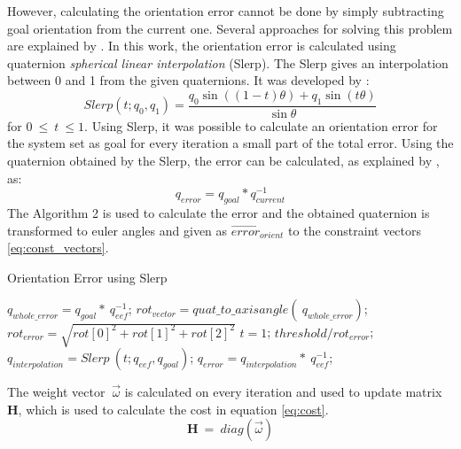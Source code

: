 However, calculating the orientation error cannot be done by simply subtracting goal orientation from the current one. Several approaches for solving this problem are explained by \cite{siciliano}. In this work, the orientation error is calculated using quaternion \textit{spherical linear interpolation} (Slerp). The Slerp gives an interpolation between 0 and 1 from the given quaternions. It was developed by \cite{slerp}:
$$ Slerp(t;q_0,q_1)=\dfrac{q_0\sin((1-t)\theta) + q_1\sin(t\theta)}{\sin\theta} 
$$
for $0\ \leq \ t\ \leq 1$. Using Slerp, it was possible to calculate an orientation error for the system set as goal for every iteration a small part of the total error. Using the quaternion obtained by the Slerp, the error can be calculated, as explained by \cite{siciliano}, as:
$$ q_{error} = q_{goal} * q_{current}^{-1} $$
The Algorithm 2 is used to calculate the error and the obtained quaternion is transformed to euler angles and given as $\vec{error}_{orient}$ to the constraint vectors \ref{eq:const_vectors}.
\begin{algorithm}[t!]
	\caption{Orientation Error using Slerp}\label{algor:error}
	\begin{algorithmic}[1]
		\vspace{2pt}
		\State $q_{whole\_error} = q_{goal} *\ q_{eef}^{-1}$;
		\vspace{2pt}
		\State $rot_{vector} = quat\_to\_axisangle(\ q_{whole\_error})$;
		\vspace{3pt}
		\State $rot_{error}  = \sqrt{rot[0]^{2} + rot[1]^{2} + rot[2]^{2}}$
		\vspace{3pt}
		\vspace{2pt}
		\State $t = 1$;
		\vspace{1pt}
		\Else 
		\State $threshold / rot_{error}$;\EndIf
		\vspace{1pt}
		\State $q_{interpolation} = Slerp\ (t;q_{eef},q_{goal})$;
		\vspace{1pt}
		\State $q_{error} = q_{interpolation} *\ q_{eef}^{-1}$;
		\vspace{-1pt}
	\end{algorithmic}
\end{algorithm}


The weight vector $\ \vec{\omega}$ is calculated on every iteration and used to update matrix $\textbf{H}$, which is used to calculate the cost in equation \ref{eq:cost}. 
\begin{equation}
	\textbf{H}\ =\ diag(\vec{\omega})
	\label{eq:h}
\end{equation}


